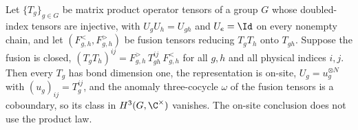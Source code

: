 \begin{theorem}%
    \label{thm:mposym_closed_fusion_onsite}
    \leanok
    Let $\{T_g\}_{g\in G}$ be matrix product operator tensors of a group $G$
    whose doubled-index tensors are injective, with $U_gU_h=U_{gh}$ and
    $U_e=\Id$ on every nonempty chain, and let $(F^<_{g,h},F^>_{g,h})$ be
    fusion tensors reducing $T_gT_h$ onto $T_{gh}$. Suppose the fusion is
    closed, $(T_gT_h)^{ij}=F^>_{g,h}\,T_{gh}^{ij}\,F^<_{g,h}$ for all $g,h$
    and all physical indices $i,j$. Then every $T_g$ has bond dimension one,
    the representation is on-site, $U_g=u_g^{\otimes N}$ with
    $(u_g)_{ij}=T_g^{ij}$, and the anomaly three-cocycle $\omega$ of the
    fusion tensors is a coboundary, so its class in $H^{3}(G,\C^{\times})$
    vanishes. The on-site conclusion does not use the product law.
\end{theorem}


